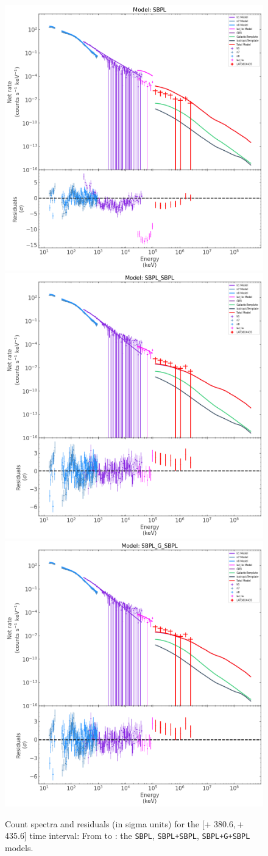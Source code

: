 \documentclass[preprint]{aastex631}
\begin{document}
\begin{figure}[t]
    \centering    
    \includegraphics[width=0.4\linewidth]{spectrum_380p61-435p61_SBPL.png}
    \includegraphics[width=0.4\linewidth]{spectrum_380p61-435p61_SBPL_SBPL.png}
    \includegraphics[width=0.4\linewidth]{best_spectrum_380p61-435p61_SBPL_G_SBPL.png}
\caption{Count spectra  and residuals (in sigma units) for the [\trig+ 380.6,\,\trig+ 435.6] time interval: From  to : the \texttt{SBPL}, \texttt{SBPL+SBPL}, \texttt{SBPL+G+SBPL} models.}
    \label{fig:interval7}
\end{figure}



%
%
%
%
%
%
%
%


\end{document}
